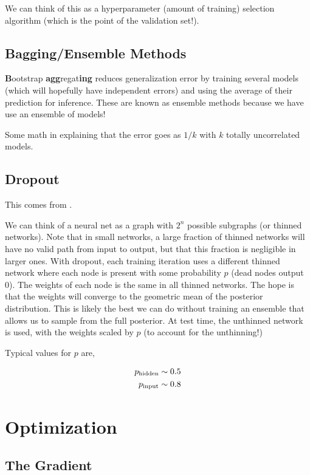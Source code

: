 \documentclass{article}
\begin{document}
We can think of this as a hyperparameter (amount of training) selection algorithm (which is the point of the validation set!).

\subsection{Bagging/Ensemble Methods}

{\bf B}ootstrap {\bf agg}regat{\bf ing} reduces generalization error by training several models (which will hopefully have independent errors) and using the average of their prediction for inference. These are known as ensemble methods because we have use an ensemble of models!

Some math in \citet[pg. 249]{Goodfellow2016} explaining that the error goes as $1/k$ with $k$ totally uncorrelated models.

\subsection{Dropout}

This comes from \citet{Srivastava2014}.

We can think of a neural net as a graph with $2^n$ possible subgraphs (or thinned networks).
Note that in small networks, a large fraction of thinned networks will have no valid path from input to output, but that this fraction is negligible in larger ones.
With dropout, each training iteration uses a different thinned network where each node is present with some probability $p$ (dead nodes output 0).
The weights of each node is the same in all thinned networks.
The hope is that the weights will converge to the geometric mean of the posterior distribution. This is likely the best we can do without training an ensemble that allows us to sample from the full posterior.
At test time, the unthinned network is used, with the weights scaled by $p$ (to account for the unthinning!)

Typical values for $p$ are,

\begin{align}
    p_{\rm hidden} &\sim 0.5 \\
    p_{\rm input} &\sim 0.8
\end{align}


\section{Optimization}

\subsection{The Gradient}
\end{document}
